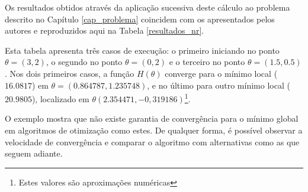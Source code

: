 \documentclass{abnt}
\begin{document}
Os resultados obtidos através da aplicação sucessiva deste cálculo ao problema descrito no Capítulo \ref{cap_problema} coincidem com os apresentados pelos autores e reproduzidos aqui na Tabela \ref{resultados_nr}.

Esta tabela apresenta três casos de execução: o primeiro iniciando no ponto $\theta=(3,2)$, o segundo no ponto $\theta=(0,2)$ e o terceiro no ponto $\theta=(1.5, 0.5)$. Nos dois primeiros casos, a função $H(\theta)$ converge para o mínimo local ($16.0817$) em $\theta=(0.864787,1.235748)$, e no último para outro mínimo local ($20.9805$), localizado em $\theta(2.354471,-0,319186)$\footnote{Estes valores são aproximações numéricas}.

O exemplo mostra que não existe garantia de convergência para o mínimo global em algoritmos de otimização como estes. De qualquer forma, é possível observar a velocidade de convergência e comparar o algoritmo com alternativas como as que seguem adiante.
\end{document}
